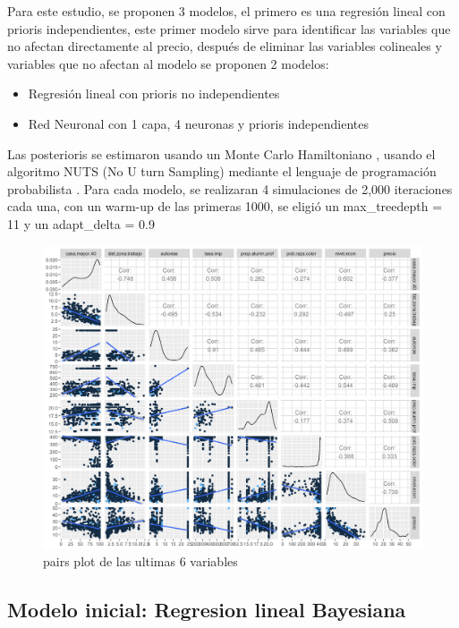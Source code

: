 \documentclass[nojss]{jss}
\begin{document}
Para este estudio, se proponen 3 modelos, el primero es una regresión lineal con prioris independientes, este primer modelo sirve para identificar las variables que no afectan directamente al precio, después de eliminar las variables colineales y variables que no afectan al modelo se proponen 2 modelos:
\begin{itemize}
	\item Regresión lineal con prioris no independientes
	\item Red Neuronal con 1 capa, 4 neuronas y prioris independientes
\end{itemize}

Las posterioris se estimaron usando un Monte Carlo Hamiltoniano \cite{DUANE1987216} \cite{betancourt2017}, usando el algoritmo NUTS (No U turn Sampling) \cite{hoffman14a} mediante el lenguaje de programación probabilista \cite{Stan}. Para cada modelo, se realizaran 4 simulaciones de 2,000 iteraciones cada una, con un warm-up de las primeras 1000, se eligió un max\_treedepth = 11 y un adapt\_delta = 0.9

\begin{figure}[H]
	\centering
	\includegraphics[scale=1]{images/pairs2-1}
	\caption[pairs]{pairs plot de las ultimas 6 variables}
	\label{fig:fig4}
\end{figure}  

\subsection{Modelo inicial: Regresion lineal Bayesiana} 
 
\end{document}

